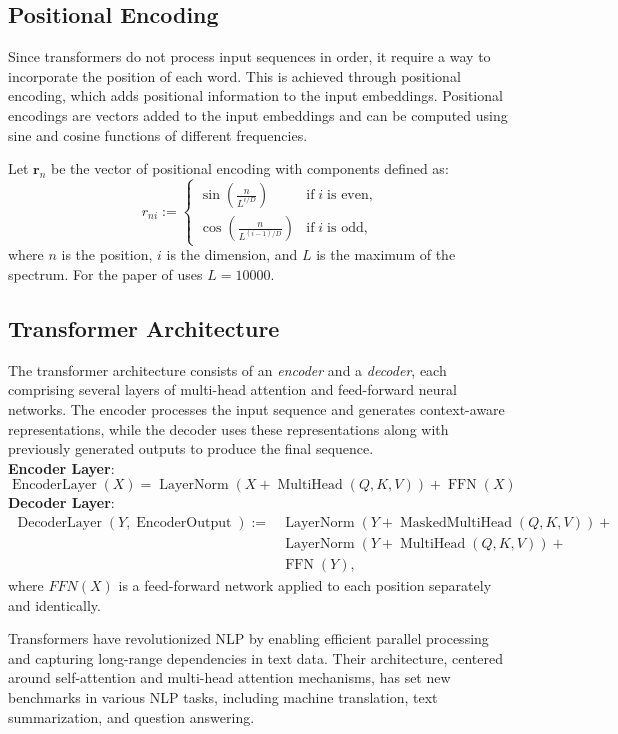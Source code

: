 \subsection{Positional Encoding}
Since transformers do not process input sequences in order, it require a way to incorporate the position of each word. This is achieved through positional encoding, which adds positional information to the input embeddings. Positional encodings are vectors added to the input embeddings and can be computed using sine and cosine functions of different frequencies.
\begin{defn}
    Let $\mathbf{r}_n$ be the vector of positional encoding with components defined as:
    \begin{equation}
        r_{ni}:=\begin{cases}
            \sin\left(\displaystyle\frac{n}{L^{i/D}}\right)&\text{if}\;i\;\text{is even,}\\
            \cos\left(\displaystyle\frac{n}{L^{(i-1)/D}}\right)&\text{if}\;i\;\text{is odd},
        \end{cases}
    \end{equation}
    where $n$ is the position, $i$ is the dimension, and $L$ is the maximum of the spectrum. For the paper of  uses $L=10000$.
\end{defn}
\subsection{Transformer Architecture}
The transformer architecture consists of an \textit{encoder} and a \textit{decoder}, each comprising several layers of multi-head attention and feed-forward neural networks. The encoder processes the input sequence and generates context-aware representations, while the decoder uses these representations along with previously generated outputs to produce the final sequence.\\
\textbf{Encoder Layer}:
\begin{equation}
    \operatorname{EncoderLayer}(X)=\operatorname{LayerNorm}(X+\operatorname{MultiHead}(Q,K,V))+\operatorname{FFN}(X)\nonumber
\end{equation}
\textbf{Decoder Layer}:
\begin{align}
    \operatorname{DecoderLayer}(Y,\operatorname{EncoderOutput}):=&\operatorname{LayerNorm}(Y+\operatorname{MaskedMultiHead}(Q,K,V))+\nonumber\\
    &\operatorname{LayerNorm}(Y+\operatorname{MultiHead}(Q,K,V))+\\
    &\operatorname{FFN}(Y)\nonumber,
\end{align}
where $FFN(X)$ is a feed-forward network applied to each position separately and identically.

Transformers have revolutionized NLP by enabling efficient parallel processing and capturing long-range dependencies in text data. Their architecture, centered around self-attention and multi-head attention mechanisms, has set new benchmarks in various NLP tasks, including machine translation, text summarization, and question answering.